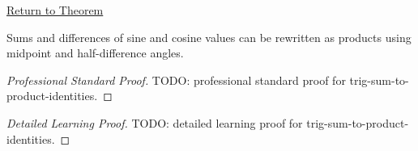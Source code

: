 \newpage
{}
\label{prf:trig-sum-to-product-identities}

\begin{remark*}[Return]
\hyperref[thm:trig-sum-to-product-identities]{Return to Theorem}
\end{remark*}

\begin{theorem*}
Sums and differences of sine and cosine values can be rewritten as products
using midpoint and half-difference angles.
\end{theorem*}

\begin{proof}[Professional Standard Proof]
\LRAProofBodyStart
TODO: professional standard proof for trig-sum-to-product-identities.
\end{proof}

\begin{proof}[Detailed Learning Proof]
\LRAProofBodyStart
TODO: detailed learning proof for trig-sum-to-product-identities.
\end{proof}

\clearpage
